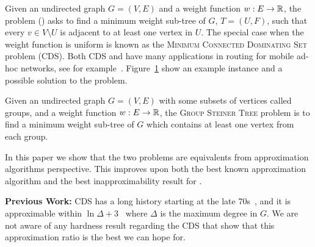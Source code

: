 % 

Given an undirected graph $G = (V, E)$ and a weight function $w:E \to \mathbb{R}$, 
the \Problem{} problem (\Prob{}) asks to find a minimum weight sub-tree of $G$, 
$T = (U, F)$, such that every $v \in V \setminus U$ is adjacent to at least one 
vertex in $U$.
The special case when the weight function is uniform is known as the 
\textsc{Minimum Connected Dominating Set} problem (CDS). 
Both CDS and \Prob{} have many applications in routing
for mobile ad-hoc networks, see for example~\cite{
shin2010approximation%
,cheng2003polynomial%
,das1997routing%
,adasme2016models%
,adasme2017minimum%
}.
Figure~\ref{fig:problem} show an example instance and a possible solution to the problem. 

\begin{figure}
\begin{center}

\end{center}
\caption{\label{fig:problem}}
\end{figure}

Given an undirected graph $G = (V, E)$ with some subsets of vertices called groups,
and a weight function $w:E \to \mathbb{R}$,
the \textsc{Group Steiner Tree} problem is to find a minimum weight sub-tree
of $G$ which contains at least one vertex from each group. 

In this paper we show that the two problems are equivalents 
from approximation algorithms perspective.
This improves upon both the best known approximation algorithm and the best 
inapproximability result for \Prob{}.

\textbf{Previous Work:}
CDS has a long history starting at the late 70s~\cite{sampathkumar1979connected},
and it is approximable within $\ln\Delta + 3$~\cite{guha1998approximation} 
where $\Delta$ is the maximum degree in $G$.
We are not aware of any hardness result regarding the CDS that show that this approximation
ratio is the best we can hope for.

